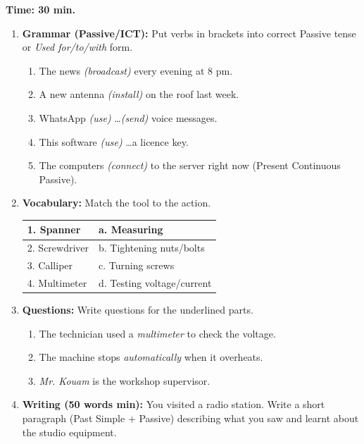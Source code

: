 \documentclass[11pt]{article}
\begin{document}
\begin{exercice}
\textbf{Time: 30 min.}
\begin{enumerate}
\item \textbf{Grammar (Passive/ICT):} Put verbs in brackets into correct Passive tense or \emph{Used for/to/with} form.
\begin{enumerate}
\item The news \emph{(broadcast)} every evening at 8 pm.
\item A new antenna \emph{(install)} on the roof last week.
\item WhatsApp \emph{(use)} \dots \emph{(send)} voice messages.
\item This software \emph{(use)} \dots a licence key.
\item The computers \emph{(connect)} to the server right now (Present Continuous Passive).
\end{enumerate}
\item \textbf{Vocabulary:} Match the tool to the action.
\begin{center}
\begin{tabular}{|l|l|}\hline
1. Spanner & a. Measuring \\ \hline
2. Screwdriver & b. Tightening nuts/bolts \\ \hline
3. Calliper & c. Turning screws \\ \hline
4. Multimeter & d. Testing voltage/current \\ \hline
\end{tabular}
\end{center}
\item \textbf{Questions:} Write questions for the underlined parts.
\begin{enumerate}
\item The technician used a \emph{multimeter} to check the voltage.
\item The machine stops \emph{automatically} when it overheats.
\item \emph{Mr. Kouam} is the workshop supervisor.
\end{enumerate}
\item \textbf{Writing (50 words min):} You visited a radio station. Write a short paragraph (Past Simple + Passive) describing what you saw and learnt about the studio equipment.
\end{enumerate}
\end{exercice}
\end{document}
